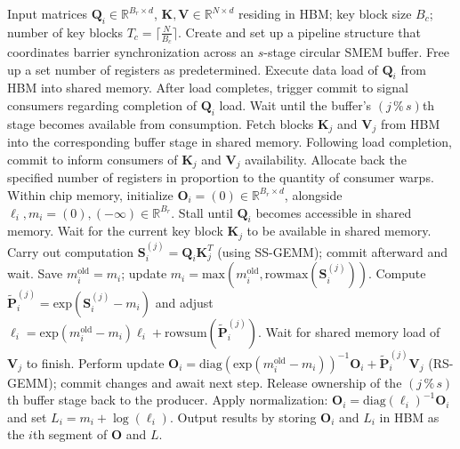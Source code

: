 \begin{algorithm}[H]
    \caption{\small\label{alg:flash3_wgmma_ws_only}\textsc{FlashAttention-3} forward pass \textbf{excluding} intra-consumer overlapping -- CTA perspective}
    \begin{algorithmic}[1]
\REQUIRE Input matrices $\mathbf{Q}_i \in \mathbb{R}^{B_r \times d}$, $\mathbf{K}, \mathbf{V} \in \mathbb{R}^{N \times d}$ residing in HBM; key block size $B_c$; number of key blocks $T_c = \lceil \frac{N}{B_c} \rceil$.
\STATE Create and set up a pipeline structure that coordinates barrier synchronization across an $s$-stage circular SMEM buffer.
\STATE Free up a set number of registers as predetermined.
\STATE Execute data load of $\mathbf{Q}_i$ from HBM into shared memory.
\STATE After load completes, trigger commit to signal consumers regarding completion of $\mathbf{Q}_i$ load.
    \STATE Wait until the buffer's $(j\,\%\,s)$th stage becomes available from consumption.
    \STATE Fetch blocks $\mathbf{K}_j$ and $\mathbf{V}_j$ from HBM into the corresponding buffer stage in shared memory.
    \STATE Following load completion, commit to inform consumers of $\mathbf{K}_j$ and $\mathbf{V}_j$ availability.
\ENDFOR
\ELSE \STATE Allocate back the specified number of registers in proportion to the quantity of consumer warps.
\STATE Within chip memory, initialize $\mathbf{O}_i = (0) \in \mathbb{R}^{B_r \times d}$, alongside $\ell_i, m_i = (0), (-\infty) \in \mathbb{R}^{B_r}$.
\STATE Stall until $\mathbf{Q}_i$ becomes accessible in shared memory.
\STATE Wait for the current key block $\mathbf{K}_j$ to be available in shared memory.
\STATE Carry out computation $\mathbf{S}_i^{(j)} = \mathbf{Q}_i \mathbf{K}_j^T$ (using SS-GEMM); commit afterward and wait. \label{alg:ws_only_gemm1}
\STATE Save $m_i^{\mathrm{old}} = m_i$; update $m_i = \mathrm{max}(m_i^{\mathrm{old}}, \mathrm{rowmax}(\mathbf{S}_i^{(j)}))$. \label{code-ws:softmax_start}
\STATE Compute $\widetilde{\mathbf{P}}_i^{(j)} = \mathrm{exp}(\mathbf{S}_i^{(j)} - m_i)$ and adjust $\ell_i = \mathrm{exp}(m_i^{\mathrm{old}} - m_i) \ell_i + \mathrm{rowsum}(\widetilde{\mathbf{P}}_i^{(j)})$. \label{code-ws:softmax_end}
\STATE Wait for shared memory load of $\mathbf{V}_j$ to finish.
\STATE Perform update $\mathbf{O}_i = \mathrm{diag}(\mathrm{exp}(m_i^{\mathrm{old}} - m_i))^{-1} \mathbf{O}_i + \widetilde{\mathbf{P}}_i^{(j)} \mathbf{V}_j$ (RS-GEMM); commit changes and await next step. \label{alg:ws_only_gemm2}
\STATE Release ownership of the $(j\,\%\,s)$th buffer stage back to the producer.
\ENDFOR
\STATE Apply normalization: $\mathbf{O}_i = \mathrm{diag}(\ell_i)^{-1} \mathbf{O}_i$ and set $L_i = m_i + \log(\ell_i)$.
\STATE Output results by storing $\mathbf{O}_i$ and $L_i$ in HBM as the $i$th segment of $\mathbf{O}$ and $L$.
\ENDIF
\end{algorithmic}
\end{algorithm}

